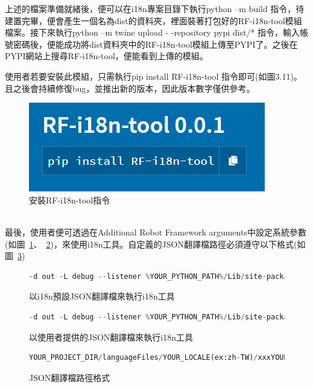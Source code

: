 上述的檔案準備就緒後，便可以在i18n專案目錄下執行python –m build 指令，待建置完畢，便會產生一個名為dist的資料夾，裡面裝著打包好的RF-i18n-tool模組檔案。接下來執行python –m twine upload - -repository pypi dist/* 指令，輸入帳號密碼後，便能成功將dist資料夾中的RF-i18n-tool模組上傳至PYPI了。之後在PYPI網站上搜尋RF-i18n-tool，便能看到上傳的模組。

使用者若要安裝此模組，只需執行pip install RF-i18n-tool 指令即可(如圖3.11)。且之後會持續修復bug，並推出新的版本，因此版本數字僅供參考。

\begin{figure}[H]
    \centering
    \includegraphics[width= .5\textwidth]{../論文截圖/3-5-8 安裝RF-AWT-i18n指令.png}
    \caption{安裝RF-i18n-tool指令}
\end{figure}

\hspace*{\fill} \\

最後，使用者便可透過在Additional Robot Framework arguments中設定系統參數(如圖~\ref{以i18n預設JSON翻譯檔來執行i18n工具}、~\ref{以使用者提供的JSON翻譯檔來執行i18n工具})，來使用i18n工具。自定義的JSON翻譯檔路徑必須遵守以下格式(如圖~\ref{JSON翻譯檔路徑格式})

\begin{figure}[H]
\begin{lstlisting}[language={python}]
-d out -L debug --listener %YOUR_PYTHON_PATH%/Lib/site-packages/i18n/listeners/I18nListener.py:YOUR_LOCALE:i18njson
\end{lstlisting}
\caption{以i18n預設JSON翻譯檔來執行i18n工具}
\label{以i18n預設JSON翻譯檔來執行i18n工具}
\end{figure}

\begin{figure}[H]
\begin{lstlisting}[language={python}]
-d out -L debug --listener %YOUR_PYTHON_PATH%/Lib/site-packages/i18n/listeners/I18nListener.py:YOUR_LOCALE
\end{lstlisting}
\caption{以使用者提供的JSON翻譯檔來執行i18n工具}
\label{以使用者提供的JSON翻譯檔來執行i18n工具}
\end{figure}

\begin{figure}[H]
\begin{lstlisting}[language={python}]
YOUR_PROJECT_DIR/languageFiles/YOUR_LOCALE(ex:zh-TW)/xxxYOUR_LOCALE.json
\end{lstlisting}
\caption{JSON翻譯檔路徑格式}
\label{JSON翻譯檔路徑格式}
\end{figure}